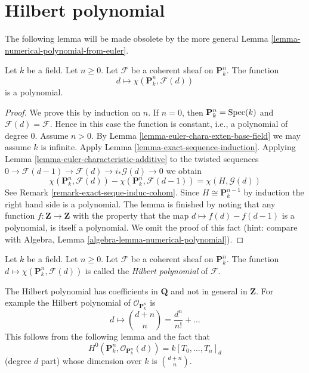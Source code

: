 \section{Hilbert polynomial}
\label{section-Hilbert-polynomial}

\noindent
The following lemma will be made obsolete by
the more general
Lemma
\ref{lemma-numerical-polynomial-from-euler}.

\begin{lemma}
\label{lemma-hilbert-polynomial}
Let $k$ be a field. Let $n \geq 0$. Let
$\mathcal{F}$ be a coherent sheaf
on $\mathbf{P}^n_k$. The function
$$
d \longmapsto \chi(\mathbf{P}^n_k,
\mathcal{F}(d))
$$
is a polynomial.
\end{lemma}

\begin{proof}
We prove this by induction on $n$. If $n =
0$, then
$\mathbf{P}^n_k = \mathop{\mathrm{Spec}}(k)$ and
$\mathcal{F}(d) = \mathcal{F}$.
Hence in this case the function is constant,
i.e., a polynomial
of degree $0$. Assume $n > 0$. By
Lemma
\ref{lemma-euler-chara-exten-base-field}
we may assume $k$ is infinite. Apply
Lemma \ref{lemma-exact-sequence-induction}.
Applying Lemma
\ref{lemma-euler-characteristic-additive}
to the twisted sequences
$0 \to \mathcal{F}(d - 1) \to \mathcal{F}(d)
\to i_*\mathcal{G}(d) \to 0$
we obtain
$$
\chi(\mathbf{P}^n_k, \mathcal{F}(d)) -
\chi(\mathbf{P}^n_k, \mathcal{F}(d - 1)) =
\chi(H, \mathcal{G}(d))
$$
See Remark
\ref{remark-exact-seque-induc-cohom}.
Since $H \cong \mathbf{P}^{n - 1}_k$
by induction the right hand side is a
polynomial.
The lemma is finished by noting that any
function
$f : \mathbf{Z} \to \mathbf{Z}$ with the
property that the map
$d \mapsto f(d) - f(d - 1)$ is a polynomial,
is itself a polynomial.
We omit the proof of this fact (hint: compare
with
Algebra, Lemma
\ref{algebra-lemma-numerical-polynomial}).
\end{proof}

\begin{definition}
\label{definition-hilbert-polynomial}
Let $k$ be a field. Let $n \geq 0$. Let
$\mathcal{F}$ be a coherent sheaf
on $\mathbf{P}^n_k$. The function
$d \mapsto \chi(\mathbf{P}^n_k,
\mathcal{F}(d))$ is called the
{\it Hilbert polynomial} of $\mathcal{F}$.
\end{definition}

\noindent
The Hilbert polynomial has coefficients in
$\mathbf{Q}$ and not
in general in $\mathbf{Z}$. For example the
Hilbert polynomial
of $\mathcal{O}_{\mathbf{P}^n_k}$ is
$$
d \longmapsto {d + n \choose n} =
\frac{d^n}{n!} + \ldots
$$
This follows from the following lemma and the
fact that
$$
H^0(\mathbf{P}^n_k,
\mathcal{O}_{\mathbf{P}^n_k}(d)) = k[T_0,
\ldots, T_n]_d
$$
(degree $d$ part) whose dimension over $k$ is
${d + n \choose n}$.

